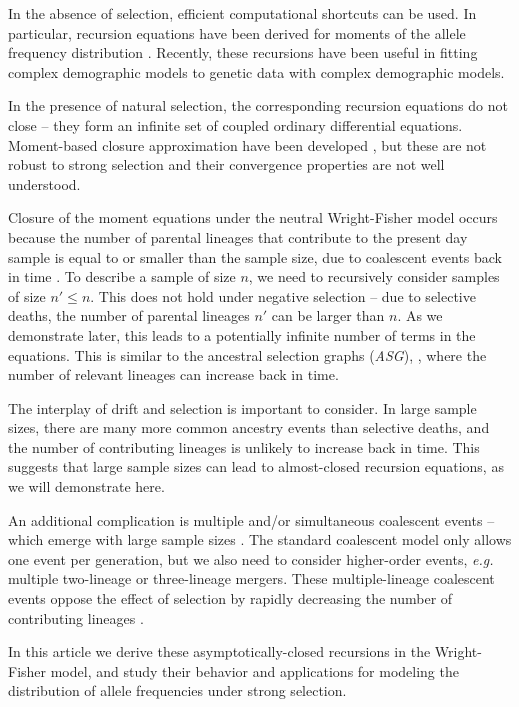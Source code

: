 \documentclass[review]{elsarticle}
\begin{document}
In the absence of selection, efficient computational shortcuts can be used. In particular, recursion
equations have been derived for moments of the allele frequency distribution
\citep{KimuraCrow1964,Ewens1972,JouganousEtAl2017}. Recently, these recursions have been useful in
fitting complex demographic models to genetic data \citep{JouganousEtAl2017,KammEtAl2017} with
complex demographic models.
 
In the presence of natural selection, the corresponding recursion equations do not close
\citep{Donnelly, JouganousEtAl2017} -- they form an infinite set of coupled ordinary differential
equations. Moment-based closure approximation have been developed \citep{JouganousEtAl2017}, but
these are not robust to strong selection and their convergence properties are not well understood.

Closure of the moment equations under the neutral Wright-Fisher model occurs because the number of
parental lineages that contribute to the present day sample is equal to or smaller than the sample
size, due to coalescent events back in time \citep{Kingman1982a}. To describe a sample of size $n$,
we need to recursively consider samples of size $n'\le n$. This does not hold under negative
selection -- due to selective deaths, the number of parental lineages $n'$ can be larger than $n$.
As we demonstrate later, this leads to a potentially infinite number of terms in the equations. This
is similar to the ancestral selection graphs (\textit{ASG}), \citep{KroneNeuhauser1997}, where the
number of relevant lineages can increase back in time.

The interplay of drift and selection is important to consider. In large sample sizes, there are many
more common ancestry events than selective deaths, and the number of contributing lineages is
unlikely to increase back in time. This suggests that large sample sizes can lead to
almost-closed recursion equations, as we will demonstrate here.

An additional complication is multiple and/or simultaneous coalescent events -- which emerge with
large sample sizes \citep{BhaskarEtAl2014}. The standard coalescent model only allows one event per
generation, but we also need to consider higher-order events, \textit{e.g.} multiple two-lineage or
three-lineage mergers. These multiple-lineage coalescent events oppose the effect of selection by
rapidly decreasing the number of contributing lineages \citep{NelsonEtAl2019}.

In this article we derive these asymptotically-closed recursions in the Wright-Fisher model, and
study their behavior and applications for modeling the distribution of allele frequencies under
strong selection.
\end{document}

